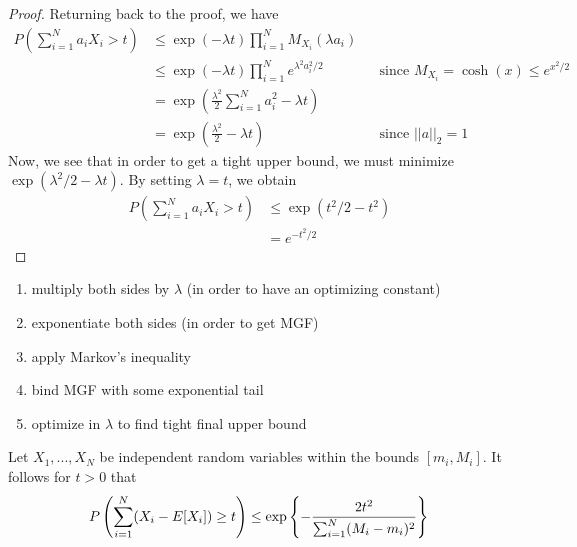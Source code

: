 \begin{proof}
    
    \noindent Returning back to the proof, we have 
    \begin{align*}
        P\left( \sum_{i=1}^{N} a_i X_i > t \right) 
            &\leq \exp(-\lambda t) \prod_{i=1}^{N} M_{X_i}(\lambda a_i) \\ 
        &\leq \exp(-\lambda t) \prod_{i=1}^{N} e^{\lambda^2 a_i^2 /2} && \text{since $M_{X_i} = \cosh(x) \leq e^{x^2/2}$} \\
        &= \exp\left( \frac{\lambda^2}{2} \sum_{i=1}^{N}a_i^2 - \lambda t \right) \\ 
        &= \exp\left( \frac{\lambda^2}{2} - \lambda t \right) && \text{since $||a||_2=1$ } 
    \end{align*}
    Now, we see that in order to get a tight upper bound, we must minimize $\exp(\lambda^2/2 - \lambda t).$ By setting $\lambda=t$, we obtain
    \begin{align*}
        P\left(\sum_{i=1}^{N} a_i X_i > t \right) &\leq \exp \left( t^2/2 - t^2 \right) \\
        &= e^{-t^2/2}
    \end{align*}
\end{proof}

\begin{tcolorbox}[colback=white!90!gray, title=Proof Technique: Hoeffding's Inequality]
\begin{enumerate}
    \item multiply both sides by $\lambda$ (in order to have an optimizing constant)
    \item exponentiate both sides (in order to get MGF)
    \item apply Markov's inequality 
    \item bind MGF with some exponential tail 
    \item optimize in $\lambda$ to find tight final upper bound
\end{enumerate}
\end{tcolorbox}


\begin{tcolorbox}
\begin{theorem}
Let $X_1, ..., X_N$ be independent random variables within the bounds $[m_i, M_i]$. It follows for $t > 0$ that 
    \begin{equation}
    P\left(\sum_{i=1}^{N} (X_i - E[X_i]) \geq t \right) \leq \exp\left\{-\frac{2t^2}{\sum_{i=1}^{N}(M_i - m_i)^2} \right\} \\ 
    \end{equation}
\end{theorem}
\end{tcolorbox}


